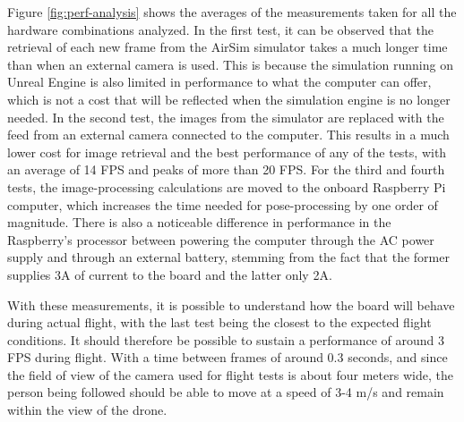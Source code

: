 Figure \ref{fig:perf-analysis} shows the averages of the measurements taken for all the hardware combinations analyzed.
In the first test, it can be observed that the retrieval of each new frame from the AirSim simulator takes a much longer time than when an external camera is used.
This is because the simulation running on Unreal Engine is also limited in performance to what the computer can offer, which is not a cost that will be reflected when the simulation engine is no longer needed.
In the second test, the images from the simulator are replaced with the feed from an external camera connected to the computer. 
This results in a much lower cost for image retrieval and the best performance of any of the tests, with an average of 14 FPS and peaks of more than 20 FPS.
For the third and fourth tests, the image-processing calculations are moved to the onboard Raspberry Pi computer, which increases the time needed for pose-processing by one order of magnitude.
There is also a noticeable difference in performance in the Raspberry's processor between powering the computer through the AC power supply and through an external battery, stemming from the fact that the former supplies 3A of current to the board and the latter only 2A.

With these measurements, it is possible to understand how the board will behave during actual flight, with the last test being the closest to the expected flight conditions.
It should therefore be possible to sustain a performance of around 3 FPS during flight.
With a time between frames of around 0.3 seconds, and since the field of view of the camera used for flight tests is about four meters wide, the person being followed should be able to move at a speed of 3-4 m/s and remain within the view of the drone.


